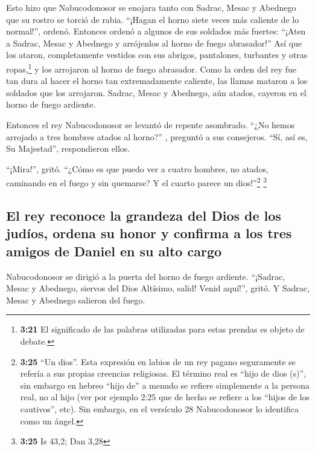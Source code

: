  Esto hizo que Nabucodonosor se enojara tanto con Sadrac,
Mesac y Abednego que su rostro se torció de rabia. ``¡Hagan el horno
siete veces más caliente de lo normal!'', ordenó. 
Entonces ordenó a algunos de sus soldados más fuertes: ``¡Aten a Sadrac,
Mesac y Abednego y arrójenlos al horno de fuego abrasador!''
 Así que los ataron, completamente vestidos con sus
abrigos, pantalones, turbantes y otras ropas,\footnote{\textbf{3:21} El
  significado de las palabras utilizadas para estas prendas es objeto de
  debate.} y los arrojaron al horno de fuego abrasador. 
Como la orden del rey fue tan dura al hacer el horno tan extremadamente
caliente, las llamas mataron a los soldados que los arrojaron.
 Sadrac, Mesac y Abednego, aún atados, cayeron en el
horno de fuego ardiente.

 Entonces el rey Nabucodonosor se levantó de repente
asombrado. ``¿No hemos arrojado a tres hombres atados al horno?'' ,
preguntó a sus consejeros. ``Sí, así es, Su Majestad'', respondieron
ellos.

 ``¡Mira!'', gritó. ``¿Cómo es que puedo ver a cuatro
hombres, no atados, caminando en el fuego y sin quemarse? Y el cuarto
parece un dios!''\footnote{\textbf{3:25} ``Un dios''. Esta expresión en
  labios de un rey pagano seguramente se refería a sus propias creencias
  religiosas. El término real es ``hijo de dios (s)'', sin embargo en
  hebreo ``hijo de'' a menudo se refiere simplemente a la persona real,
  no al hijo (ver por ejemplo 2:25 que de hecho se refiere a los ``hijos
  de los cautivos'', etc). Sin embargo, en el versículo 28 Nabucodonosor
  lo identifica como un ángel.} \footnote{\textbf{3:25} Is 43,2; Dan
  3,28}

\hypertarget{el-rey-reconoce-la-grandeza-del-dios-de-los-juduxedos-ordena-su-honor-y-confirma-a-los-tres-amigos-de-daniel-en-su-alto-cargo}{%
\subsection{El rey reconoce la grandeza del Dios de los judíos, ordena
su honor y confirma a los tres amigos de Daniel en su alto
cargo}\label{el-rey-reconoce-la-grandeza-del-dios-de-los-juduxedos-ordena-su-honor-y-confirma-a-los-tres-amigos-de-daniel-en-su-alto-cargo}}

 Nabucodonosor se dirigió a la puerta del horno de fuego
ardiente. ``¡Sadrac, Mesac y Abednego, siervos del Dios Altísimo, salid!
Venid aquí!'', gritó. Y Sadrac, Mesac y Abednego salieron del fuego.

